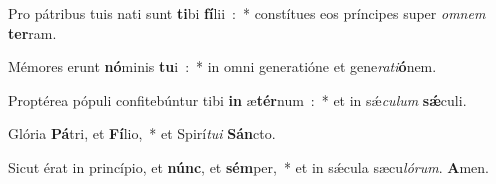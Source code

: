 \item Pro pátribus tuis nati sunt \textbf{ti}bi \textbf{fí}lii~:~* constítues eos príncipes super \emph{om}\emph{nem} \textbf{ter}ram.
\item Mémores erunt \textbf{nó}minis \textbf{tu}i~:~* in omni generatióne et gene\emph{ra}\emph{ti}\textbf{ó}nem.
\item Proptérea pópuli confitebúntur tibi \textbf{in} æ\textbf{tér}num~:~* et in sǽ\emph{cu}\emph{lum} \textbf{sǽ}culi.
\item Glória \textbf{Pá}tri, et \textbf{Fí}lio,~* et Spirí\emph{tu}\emph{i} \textbf{Sán}cto.
\item Sicut érat in princípio, et \textbf{núnc}, et \textbf{sém}per,~* et in sǽcula sæcu\emph{ló}\emph{rum}. \textbf{A}men.
